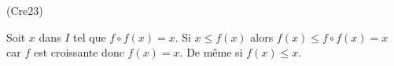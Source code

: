 \begin{tiny}(Cre23)\end{tiny} Soit $x$ dans $I$ tel que $f\circ f(x)=x$. Si $x\leq f(x)$ alors $f(x)\leq f\circ f(x)=x$ car $f$ est croissante donc $f(x)=x$. De même si $f(x)\leq x$. 